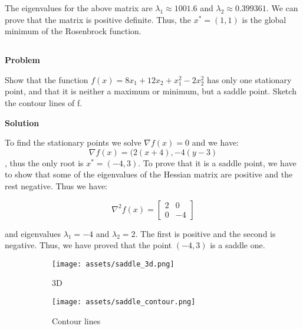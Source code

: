 \documentclass[a4paper,11pt]{article}
\numberwithin{equation}{section} %
\begin{document}
The eigenvalues for the above matrix are $\lambda_1 \approx 1001.6$ and $\lambda_2 \approx 0.399361$. We can prove that the matrix is positive definite. Thus, the $x^{*} = (1,1)$ is the global minimum of the Rosenbrock function.

\subsection{}

\textbf{Problem}

Show that the function $f(x) = 8x_1 + 12x_2 + x_1^2 - 2x_2^2$ has only one stationary
point, and that it is neither a maximum or minimum, but a saddle point. Sketch the contour
lines of f.

\textbf{Solution}


To find the stationary points we solve $\nabla f(x) = 0$ and we have:
\begin{equation}
    \nabla f(x) = (2(x+4), -4(y-3)
\end{equation}
, thus the only root is $x^{*} = (-4, 3)$. To prove that it is a saddle point, we have to show that some of the eigenvalues of the Hessian matrix are positive and the rest negative. Thus we have:

\begin{equation}
    \nabla^2 f(x) = 
    \begin{bmatrix}
        2 & 0 \\
        0 & -4
    \end{bmatrix}
\end{equation}

and eigenvalues $\lambda_1 = -4$ and $\lambda_2 = 2$. The first is positive and the second is negative. Thus, we have proved that the point $(-4, 3)$ is a saddle one.

\begin{figure}[h!]
     \centering
     \begin{subfigure}[b]{0.45\textwidth}
         \centering
         \texttt{[image: assets/saddle\_3d.png]}
         \caption{3D}
     \end{subfigure}
     \hfill
     \begin{subfigure}[b]{0.45\textwidth}
         \centering
         \texttt{[image: assets/saddle\_contour.png]}
         \caption{Contour lines}
     \end{subfigure}
    \caption{}
\end{figure}

\subsection{}
\end{document}
